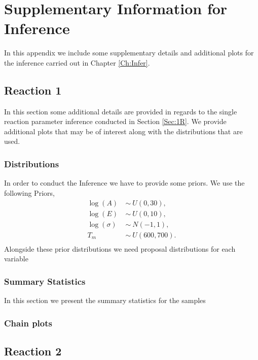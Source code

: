 \chapter{Supplementary Information for Inference}
In this appendix we include some supplementary details and additional plots for the inference carried out in Chapter \ref{Ch:Infer}.
\section{Reaction 1}
In this section some additional details are provided in regards to the single reaction parameter inference conducted in Section \ref{Sec:1R}. We provide additional plots that may be of interest along with the distributions that are used.
\subsection{Distributions}
\label{App:Distributions}
In order to conduct the Inference we have to provide some priors. We use the following Priors,
\begin{align*}
\log\left(A\right) ~ &\sim ~ U\left(0,30\right), \\
\log\left(E\right) ~ &\sim ~ U\left(0,10\right), \\
\log\left(\sigma\right) ~ &\sim ~ N\left(-1,1\right), \\
T_m ~ &\sim ~ U\left(600,700\right). \\
\end{align*}
Alongside these prior distributions we need proposal distributions for each variable
\subsection{Summary Statistics}
\label{App:1_Summary}
In this section we present the summary statistics for the samples
\subsection{Chain plots}
\label{App:1_traces}

\section{Reaction 2}
\label{App:2_traces}
